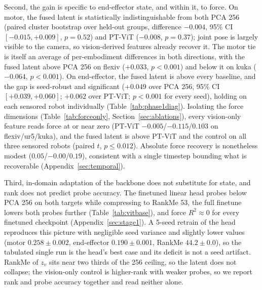 \documentclass{article}
\begin{document}
Second, the gain is specific to end-effector state, and within it, to force. On motor, the fused latent is statistically indistinguishable from both PCA 256 (paired cluster bootstrap over held-out groups, difference $-0.004$, 95\% CI $[-0.015, +0.009]$, $p=0.52$) and PT-ViT ($-0.008$, $p=0.37$); joint pose is largely visible to the camera, so vision-derived features already recover it. The motor tie is itself an average of per-embodiment differences in both directions, with the fused latent above PCA 256 on flexiv ($+0.033$, $p<0.001$) and below it on kuka ($-0.064$, $p<0.001$). On end-effector, the fused latent is above every baseline, and the gap is seed-robust and significant ($+0.049$ over PCA 256, 95\% CI $[+0.039, +0.060]$; $+0.062$ over PT-ViT; $p<0.001$ for every seed), holding on each sensored robot individually (Table~\ref{tab:phase1diag}). Isolating the force dimensions (Table~\ref{tab:forceonly}, Section~\ref{sec:ablations}), every vision-only feature reads force at or near zero (PT-ViT $-0.005$/$-0.115$/$0.103$ on flexiv/ur5/kuka), and the fused latent is above PT-ViT and the control on all three sensored robots (paired $t$, $p\le0.012$). Absolute force recovery is nonetheless modest ($0.05$/$-0.00$/$0.19$), consistent with a single timestep bounding what is recoverable (Appendix~\ref{sec:temporal}).

Third, in-domain adaptation of the backbone does not substitute for state, and rank does not predict probe accuracy. The finetuned linear head probes below PCA 256 on both targets while compressing to RankMe 53, the full finetune lowers both probes further (Table~\ref{tab:vitbase}), and force $R^2\approx0$ for every finetuned checkpoint (Appendix~\ref{sec:stage1}). A 5-seed retrain of the head reproduces this picture with negligible seed variance and slightly lower values (motor $0.258\pm0.002$, end-effector $0.190\pm0.001$, RankMe $44.2\pm0.0$), so the tabulated single run is the head's best case and its deficit is not a seed artifact. RankMe of $z_v$ sits near two thirds of the 256 ceiling, so the latent does not collapse; the vision-only control is higher-rank with weaker probes, so we report rank and probe accuracy together and read neither alone.
\end{document}
